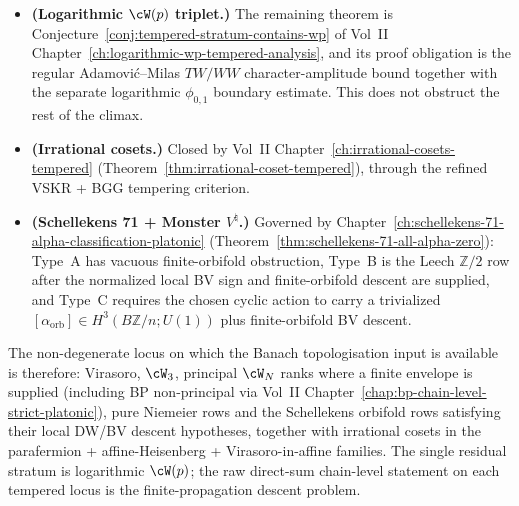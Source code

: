 \begin{remark}
\begin{itemize}[nosep]
\item \textbf{(Logarithmic $\cW(p)$ triplet.)} The remaining theorem is
 Conjecture~\ref{conj:tempered-stratum-contains-wp} of Vol~II
 Chapter~\ref{ch:logarithmic-wp-tempered-analysis},
 and its proof obligation is the regular Adamovi\'c--Milas $TW/WW$
 character-amplitude bound together with the separate logarithmic
 $\phi_{0,1}$ boundary estimate. This does not obstruct the rest of the
 climax.
\item \textbf{(Irrational cosets.)} Closed by Vol~II
 Chapter~\ref{ch:irrational-cosets-tempered}
 (Theorem~\ref{thm:irrational-coset-tempered}), through the refined
 VSKR + BGG tempering criterion.
\item \textbf{(Schellekens 71 + Monster $V^\natural$.)} Governed by
 Chapter~\ref{ch:schellekens-71-alpha-classification-platonic}
 (Theorem~\ref{thm:schellekens-71-all-alpha-zero}): Type~A has
 vacuous finite-orbifold obstruction, Type~B is the Leech
 $\mathbb Z/2$ row after the normalized local BV sign and
 finite-orbifold descent are supplied, and Type~C requires the
 chosen cyclic action to carry a trivialized
 $[\alpha_{\mathrm{orb}}]\in H^3(B\mathbb Z/n;U(1))$ plus
 finite-orbifold BV descent.
\end{itemize}
The non-degenerate locus on which the Banach topologisation input is
available is therefore: Virasoro, $\cW_3$, principal $\cW_N$ ranks
where a finite envelope is supplied (including BP non-principal via
Vol~II Chapter~\ref{chap:bp-chain-level-strict-platonic}),
pure Niemeier rows and the Schellekens orbifold rows satisfying their
local DW/BV descent hypotheses, together with irrational cosets in the
parafermion + affine-Heisenberg + Virasoro-in-affine families.
The single residual stratum is logarithmic $\cW(p)$; the raw
direct-sum chain-level statement on each tempered locus is the
finite-propagation descent problem.
\end{remark}
